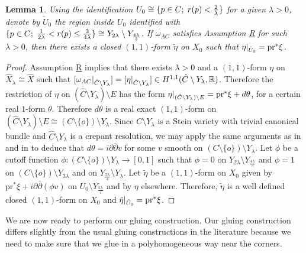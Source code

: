 \documentclass[a4paper,11pt]{article}
\newcounter{mythm}[section]
\newtheorem{lm}[mythm]{Lemma}
\def\R{\mathbb{R}}
\newcommand\restr[2]{{%
  \left.\kern-\nulldelimiterspace %
  #1 %
  \littletaller %
  \right|_{#2} %
  }}
\newcommand{\littletaller}{\mathchoice{\vphantom{\big|}}{}{}{}}
\begin{document}
\begin{lm} \label{lemma form}
    Using the identification $U_0 \cong \{ p \in C; \hspace{0.1cm} r(p) < \frac{2}{\lambda}\}$ for a given $\lambda >0$, denote by $\tilde U_0$ the region inside $U_0$ identified with $\{p \in C; \hspace{0.1cm}  \frac{ 1}{ 2\lambda} < r(p)\leq \frac{3}{ 4\lambda} \} \cong Y_{2 \lambda} \setminus Y_{\frac{4\lambda}{3}}$. If $\omega_{AC}$ satisfies Assumption \hyperlink{R}{R} for such $\lambda>0$, then there exists a closed $(1,1)$-form $\tilde \eta$ on $X_0$ such that $\restr{\eta}{\tilde U_0} = \mathrm{pr}^* \xi$.
\end{lm}
\begin{proof}
Assumption \hyperlink{R}{R} implies that there exists $\lambda>0$ and a $(1,1)$-form $ \eta$ on $\hat X_\lambda \cong \hat X$ such that $[ \restr{\omega_{AC}}{\hat C \setminus Y_\lambda} ] = [ \restr{\eta}{\hat C \setminus Y_\lambda} ] \in H^{1,1}(\hat C \setminus Y_\lambda, \R)$. Therefore the restriction of $\eta$ on $(\hat C \setminus Y_\lambda) \setminus E$ has the form $\restr{\eta}{(\hat C \setminus Y_\lambda) \setminus E} = \mathrm{pr}^* \xi + d \theta$, for a certain real $1$-form $\theta$. Therefore $d \theta$ is a real exact $(1,1)$-form on $(\hat C \setminus Y_\lambda) \setminus E \cong (C \setminus \{ o\}) \setminus Y_\lambda$. Since $C  \setminus Y_\lambda $ is a Stein variety with trivial canonical bundle and $\hat C \setminus Y_\lambda$ is a crepant resolution, we may apply the same arguments as in \cite[Appendix A]{conlon2013asymptotically} and in \cite[Lemma 5.5, Lemma 5.6]{goto_calabi-yau_2012} to deduce that $d \theta = i \partial \overline{\partial}v$ for some $v$ smooth on $(C \setminus \{ o\}) \setminus Y_\lambda $. Let $\phi$ be a cutoff function $\phi :(C \setminus \{ o\}) \setminus Y_\lambda \rightarrow [0,1]$ such that $\phi =0$ on $Y_{2 \lambda} \setminus Y_{\frac{4 \lambda}{3}}$ and $\phi =1$ on $(C \setminus \{ o\}) \setminus Y_{3\lambda}$ and on $Y_{\frac{5 \lambda}{4}} \setminus Y_{\lambda}$. Let $\tilde \eta$ be a $(1,1)$-form on $X_0$ given by $\mathrm{pr}^{*} \xi + i \partial \overline{\partial}(\phi v)$ on $U_0 \setminus Y_{\frac{5 \lambda}{4}}$ and by $\eta$ elsewhere. Therefore, $\tilde \eta$ is a well defined closed $(1,1)$-form on $X_0$ and $\restr{\tilde \eta}{\tilde U_0} = \mathrm{pr}^{*} \xi$.

 \end{proof}

We are now ready to perform our gluing construction. Our gluing construction differs slightly from the usual gluing constructions in the literature because we need to make sure that we glue in a polyhomogeneous way near the corners.
\end{document}

